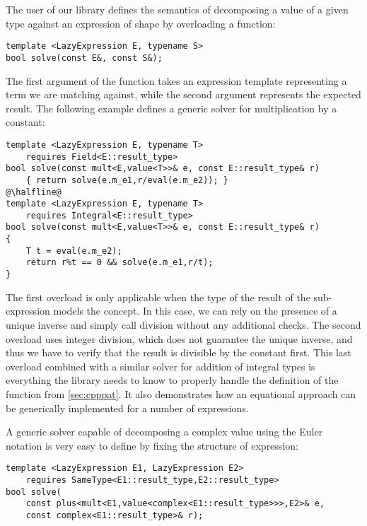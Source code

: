 
\noindent
The user of our library defines the semantics of decomposing a value of a given 
type  against an expression of shape  by overloading a function: 

\begin{lstlisting}
template <LazyExpression E, typename S> 
bool solve(const E&, const S&);
\end{lstlisting}

\noindent
The first argument of the function takes an expression template representing a 
term we are matching against, while the second argument represents the expected 
result. The following example defines a generic solver for multiplication by a 
constant:

\begin{lstlisting}
template <LazyExpression E, typename T> 
    requires Field<E::result_type>
bool solve(const mult<E,value<T>>& e, const E::result_type& r)
    { return solve(e.m_e1,r/eval(e.m_e2)); }
@\halfline@
template <LazyExpression E, typename T>
    requires Integral<E::result_type>
bool solve(const mult<E,value<T>>& e, const E::result_type& r) 
{
    T t = eval(e.m_e2);
    return r%t == 0 && solve(e.m_e1,r/t);
}
\end{lstlisting}

\noindent
The first overload is only applicable when the type of the result of the 
sub-expression models the  concept. In this case, we can rely on the 
presence of a unique inverse and simply call division without any additional 
checks. The second overload uses integer division, which does not guarantee the 
unique inverse, and thus we have to verify that the result is divisible by the 
constant first. This last overload combined with a similar solver for addition 
of integral types is everything the library needs to know to properly handle the 
definition of the  function from \textsection\ref{sec:cpppat}. It also 
demonstrates how an equational approach can be generically implemented for a 
number of expressions.

A generic solver capable of decomposing a complex value using the Euler 
notation is very easy to define by fixing the structure of expression:

\begin{lstlisting}[keepspaces]
template <LazyExpression E1, LazyExpression E2> 
    requires SameType<E1::result_type,E2::result_type>
bool solve(
    const plus<mult<E1,value<complex<E1::result_type>>>,E2>& e, 
    const complex<E1::result_type>& r);
\end{lstlisting}

